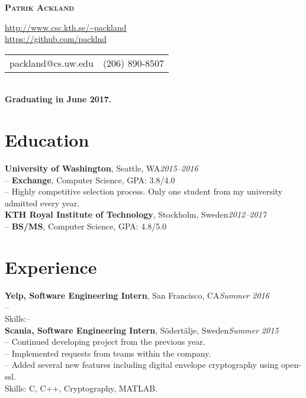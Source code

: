 \documentclass[10pt]{article}
\begin{document}

\centerline{\LARGE \textbf{\textsc{Patrik Ackland}}}

\begin{center}
  \url{http://www.csc.kth.se/~packland}\\
  \vspace{0.3em}
  \url{https://github.com/packlnd}\\
  \vspace{0.3em}
  \begin{tabular}{l r}
    packland@cs.uw.edu&(206) 890-8507
  \end{tabular} \\
  \vspace{0.3em}
  \textbf{Graduating in June 2017.}
\end{center}

\section*{Education}
\vspace{0.1em}
\hline
\vspace{0.3em}
\noindent\textbf{University of Washington}, Seattle, WA\hfill\textit{2015--2016}\\
\indent-- \textbf{Exchange}, Computer Science, GPA: 3.8/4.0\\
\indent-- Highly competitive selection process. Only one student from my university admitted every year.\\

\noindent\textbf{KTH Royal Institute of Technology}, Stockholm, Sweden\hfill\textit{2012--2017}\\
\indent-- \textbf{BS/MS}, Computer Science, GPA: 4.8/5.0\\

\section*{Experience}
\vspace{0.1em}
\hline
\vspace{0.3em}
\noindent\textbf{Yelp, Software Engineering Intern}, San Francisco, CA\hfill\textit{Summer 2016}\\
\indent-- \\
\indent Skills:--\\

\noindent\textbf{Scania, Software Engineering Intern}, Södertälje, Sweden\hfill\textit{Summer 2015}\\
\indent-- Continued developing project from the previous year.\\
\indent-- Implemented requests from teams within the company.\\
\indent-- Added several new features including digital envelope cryptography using open-ssl.\\
\indent Skills: C, C++, Cryptography, MATLAB. \\
\end{document}
